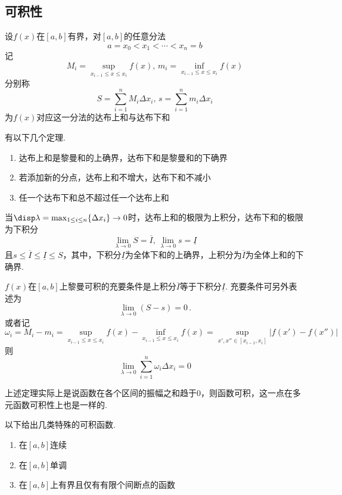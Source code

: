 \subsection{可积性}
\begin{definition}[达布(Darboux)和]
设$f(x)$在$[a,b]$有界，对$[a,b]$的任意分法
\[a=x_0<x_1<\cdots<x_n=b\]
记
\[M_i=\sup_{x_{i-1}\leq x\leq x_i}f(x),\,m_i=\inf_{x_{i-1}\leq x\leq x_i}f(x)\]
分别称
\[S=\sum_{i=1}^nM_i\Delta x_i,\,s=\sum_{i=1}^nm_i\Delta x_i\]
为$f(x)$对应这一分法的达布上和与达布下和
\end{definition}
\par 有以下几个定理.
\begin{theorem}\mbox{}\par
\begin{enumerate}
	\item 达布上和是黎曼和的上确界，达布下和是黎曼和的下确界
	\item 若添加新的分点，达布上和不增大，达布下和不减小
	\item 任一个达布下和总不超过任一个达布上和
\end{enumerate}
\end{theorem}
\begin{theorem}[达布定理]
当$\disp\lambda=\max_{1\leq i\leq n}\{\Delta x_i\}\to 0$时，达布上和的极限为上积分，达布下和的极限为下积分
\[\lim_{\lambda\to 0}S=\overline{I},\,\lim_{\lambda\to 0}s=\underline{I}\]
且$s\leq\overline{I}\leq\underline{I}\leq S$，其中，下积分$\underline{I}$为全体下和的上确界，上积分为$\overline{I}$为全体上和的下确界.
\end{theorem}
\begin{theorem}[可积的充要条件]
\label{thm:integrality}
$f(x)$在$[a,b]$上黎曼可积的充要条件是上积分$\overline{I}$等于下积分$\underline{I}$.
充要条件可另外表述为
\[\lim_{\lambda\to 0}(S-s)=0\,.\]
或者记
\[\omega_i=M_i-m_i=\sup_{x_{i-1}\leq x\leq x_i}f(x)-\inf_{x_{i-1}\leq x\leq x_i}f(x)=\sup_{x',x''\in[x_{i-1},x_i]}|f(x')-f(x'')|\]
则
\[\lim_{\lambda\to 0}\sum_{i=1}^n\omega_i\Delta x_i=0\]
\end{theorem}
\par 上述定理实际上是说函数在各个区间的振幅之和趋于$0$，则函数可积，这一点在多元函数可积性上也是一样的.
\par 以下给出几类特殊的可积函数.
\begin{enumerate}
	\item 在$[a,b]$连续
	\item 在$[a,b]$单调
	\item 在$[a,b]$上有界且仅有有限个间断点的函数
\end{enumerate}
